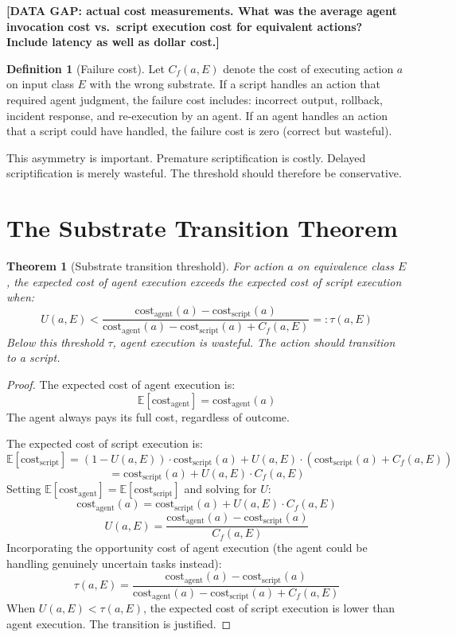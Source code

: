 \documentclass[11pt]{article}
\newtheorem{theorem}{Theorem}
\theoremstyle{definition}
\newtheorem{definition}{Definition}
\begin{document}
\textbf{[DATA GAP: actual cost measurements. What was the average agent
invocation cost vs.\ script execution cost for equivalent actions?
Include latency as well as dollar cost.]}

\begin{definition}[Failure cost]
\label{def:failure-cost}
Let $C_f(a, E)$ denote the cost of executing action $a$ on input class
$E$ with the wrong substrate. If a script handles an action that
required agent judgment, the failure cost includes: incorrect output,
rollback, incident response, and re-execution by an agent. If an agent
handles an action that a script could have handled, the failure cost is
zero (correct but wasteful).
\end{definition}

This asymmetry is important. Premature scriptification is costly.
Delayed scriptification is merely wasteful. The threshold should
therefore be conservative.

\section{The Substrate Transition Theorem}
\label{sec:theorem}

\begin{theorem}[Substrate transition threshold]
\label{thm:substrate}
For action $a$ on equivalence class $E$, the expected cost of agent
execution exceeds the expected cost of script execution when:
\[
U(a, E) < \frac{\text{cost}_{\text{agent}}(a) -
\text{cost}_{\text{script}}(a)}{\text{cost}_{\text{agent}}(a) -
\text{cost}_{\text{script}}(a) + C_f(a, E)}
=: \tau(a, E)
\]
Below this threshold $\tau$, agent execution is wasteful. The action
should transition to a script.
\end{theorem}

\begin{proof}
The expected cost of agent execution is:
\[
\mathbb{E}[\text{cost}_{\text{agent}}] =
\text{cost}_{\text{agent}}(a)
\]
The agent always pays its full cost, regardless of outcome.

The expected cost of script execution is:
\[
\mathbb{E}[\text{cost}_{\text{script}}] =
(1 - U(a,E)) \cdot \text{cost}_{\text{script}}(a) +
U(a,E) \cdot (\text{cost}_{\text{script}}(a) + C_f(a,E))
\]
\[
= \text{cost}_{\text{script}}(a) + U(a,E) \cdot C_f(a,E)
\]
Setting $\mathbb{E}[\text{cost}_{\text{agent}}] =
\mathbb{E}[\text{cost}_{\text{script}}]$ and solving for $U$:
\[
\text{cost}_{\text{agent}}(a) = \text{cost}_{\text{script}}(a) +
U(a,E) \cdot C_f(a,E)
\]
\[
U(a,E) = \frac{\text{cost}_{\text{agent}}(a) -
\text{cost}_{\text{script}}(a)}{C_f(a,E)}
\]
Incorporating the opportunity cost of agent execution (the agent
could be handling genuinely uncertain tasks instead):
\[
\tau(a, E) = \frac{\text{cost}_{\text{agent}}(a) -
\text{cost}_{\text{script}}(a)}{\text{cost}_{\text{agent}}(a) -
\text{cost}_{\text{script}}(a) + C_f(a, E)}
\]
When $U(a,E) < \tau(a,E)$, the expected cost of script execution is
lower than agent execution. The transition is justified.
\end{proof}
\end{document}
